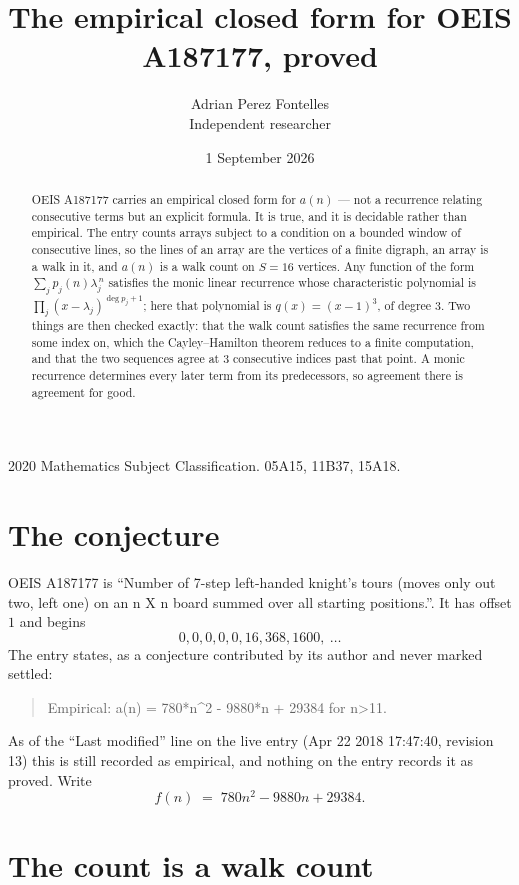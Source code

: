\documentclass[11pt,a4paper]{article}
\title{The empirical closed form for OEIS A187177, proved}
\author{Adrian Perez Fontelles\\ \small Independent researcher}
\date{1 September 2026}
\theoremstyle{plain}
\theoremstyle{definition}
\begin{document}
\maketitle

\begin{abstract}
OEIS A187177 carries an empirical closed form for $a(n)$ --- not a recurrence relating
consecutive terms but an explicit formula. It is true, and it is decidable rather than
empirical. The entry counts arrays subject to a condition on a bounded window of consecutive lines, so the lines of an array are the
vertices of a finite digraph, an array is a walk in it, and $a(n)$ is a walk count on
$S=16$ vertices. Any function of the form $\sum_j p_j(n)\lambda_j^{\,n}$ satisfies the
monic linear recurrence whose characteristic polynomial is
$\prod_j(x-\lambda_j)^{\deg p_j+1}$; here that polynomial is $q(x)=(x-1)^{3}$, of degree
$3$. Two things are then checked exactly: that the walk count satisfies the same
recurrence from some index on, which the Cayley--Hamilton theorem reduces to a finite
computation, and that the two sequences agree at $3$ consecutive indices past that
point. A monic recurrence determines every later term from its predecessors, so agreement
there is agreement for good.
\end{abstract}

\noindent\small 2020 Mathematics Subject Classification. 05A15, 11B37, 15A18.\normalsize

\section{The conjecture}

OEIS A187177 is ``Number of 7-step left-handed knight's tours (moves only out two, left one) on an n X n board summed over all starting positions.''. It has offset $1$ and begins
\[
0, 0, 0, 0, 0, 16, 368, 1600,\ \dots
\]
The entry states, as a conjecture contributed by its author and never marked settled:
\begin{quote}
Empirical: a(n) = 780*n\^{}2 - 9880*n + 29384 for n>11.
\end{quote}
As of the ``Last modified'' line on the live entry (Apr 22 2018 17:47:40, revision 13) this is still
recorded as empirical, and nothing on the entry records it as proved. Write
\[
f(n)\;=\;780 n^{2} - 9880 n + 29384.
\]

\section{The count is a walk count}
\end{document}
